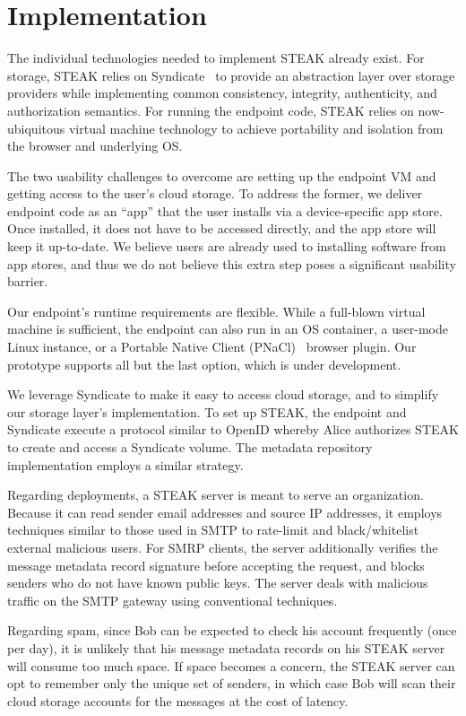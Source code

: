 \section{Implementation}
\label{sec:implementation}

The individual technologies needed to implement STEAK already exist.  For storage, STEAK relies on Syndicate~\cite{syndicate} to provide an abstraction layer over storage providers while implementing common consistency, integrity, authenticity, and authorization semantics.  For running the endpoint code, STEAK relies on now-ubiquitous virtual machine technology to achieve portability and isolation from the browser and underlying OS.

The two usability challenges to overcome are setting up the endpoint VM and getting access to the user’s cloud storage.  To address the former, we deliver endpoint code as an “app” that the user installs via a device-specific app store.  Once installed, it does not have to be accessed directly, and the app store will keep it up-to-date.  We believe users are already used to installing software from app stores, and thus we do not believe this extra step poses a significant usability barrier.

Our endpoint’s runtime requirements are flexible.  While a full-blown virtual machine is sufficient, the endpoint can also run in an OS container, a user-mode Linux instance, or a Portable Native Client (PNaCl)~\cite{pnacl} browser plugin.  Our prototype supports all but the last option, which is under development.

We leverage Syndicate to make it easy to access cloud storage, and to simplify our storage layer’s implementation.  To set up STEAK, the endpoint and Syndicate execute a protocol similar to OpenID whereby Alice authorizes STEAK to create and access a Syndicate volume.  The metadata repository implementation employs a similar strategy.

Regarding deployments, a STEAK server is meant to serve an organization.  Because it can read sender email addresses and source IP addresses, it employs techniques similar to those used in SMTP to rate-limit and black/whitelist external malicious users.  For SMRP clients, the server additionally verifies the message metadata record signature before accepting the request, and blocks senders who do not have known public keys.  The server deals with malicious traffic on the SMTP gateway using conventional techniques.

Regarding spam, since Bob can be expected to check his account frequently (once per day), it is unlikely that his message metadata records on his STEAK server will consume too much space.  If space becomes a concern, the STEAK server can opt to remember only the unique set of senders, in which case Bob will scan their cloud storage accounts for the messages at the cost of latency.


